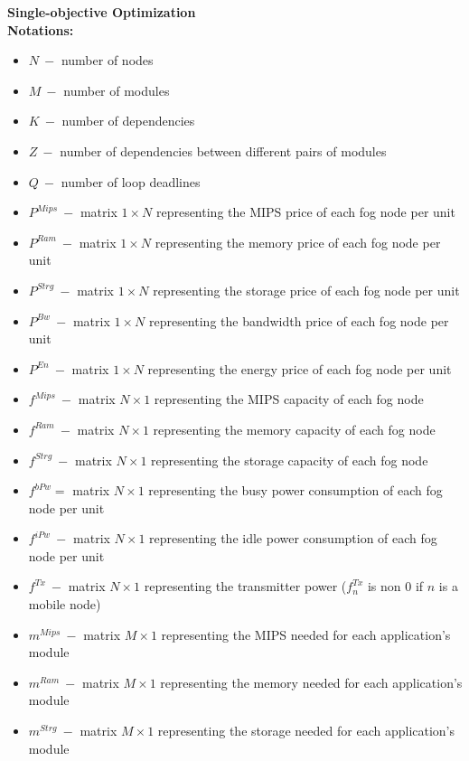 \documentclass{article}
\begin{document}
\newcommand{\SubItem}[1]{
    {\setlength\itemindent{15pt} \item[-] #1}
}

\pagebreak
\noindent\textbf{Single-objective Optimization}\\[6pt]
\noindent\textbf{Notations:}
\begin{itemize}
	\item $N~-$ number of nodes
	\item $M~-$ number of modules
	\item $K~-$ number of dependencies
	\item $Z~-$ number of dependencies between different pairs of modules
	\item $Q~-$ number of loop deadlines\\
	
	\item $P^{Mips}~-$ matrix $1\times N$ representing the MIPS price of each fog node per unit
	\item $P^{Ram}~-$ matrix $1\times N$ representing the memory price of each fog node per unit
	\item $P^{Strg}~-$ matrix $1\times N$ representing the storage price of each fog node per unit
	\item $P^{Bw}~-$ matrix $1\times N$ representing the bandwidth price of each fog node per unit
	\item $P^{En}~-$ matrix $1\times N$ representing the energy price of each fog node per unit\\
	
	\item $f^{Mips}~-$ matrix $N\times 1$ representing the MIPS capacity of each fog node
	\item $f^{Ram}~-$ matrix $N\times 1$ representing the memory capacity of each fog node
	\item $f^{Strg}~-$ matrix $N\times 1$ representing the storage capacity of each fog node
	\item $f^{bPw}=$ matrix $N\times 1$ representing the busy power consumption of each fog node per unit
	\item $f^{iPw}~-$ matrix $N\times 1$ representing the idle power consumption of each fog node per unit
	\item $f^{Tx}~-$ matrix $N\times 1$ representing the transmitter power ($f^{Tx}_n$ is non 0 if $n$ is a mobile node)\\
	
	\item $m^{Mips}~-$ matrix $M\times 1$ representing the MIPS needed for each application's module
	\item $m^{Ram}~-$ matrix $M\times 1$ representing the memory needed for each application's module
	\item $m^{Strg}~-$ matrix $M\times 1$ representing the storage needed for each application's module\\
	

\end{itemize}
\end{document}
